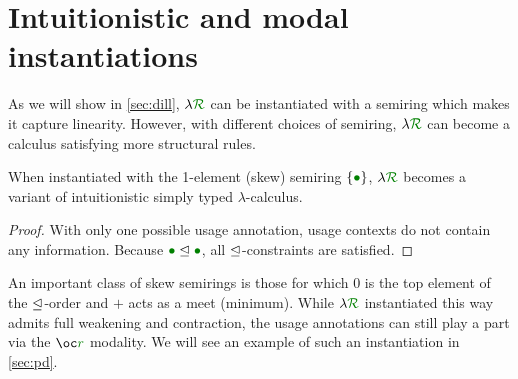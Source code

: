 \documentclass[submission,copyright,creativecommons]{eptcs}
\begin{document}


\section{Intuitionistic and modal instantiations}\label{sec:general}

As we will show in \autoref{sec:dill}, $\name$ can be instantiated with
a semiring which makes it capture linearity.
However, with different choices of semiring, $\name$ can become a calculus
satisfying more structural rules.

\begin{lemma}
  When instantiated with the 1-element (skew) semiring
  $\{\rescomment{\bullet}\}$, $\name$ becomes a variant of intuitionistic
  simply typed $\lambda$-calculus.
\end{lemma}
\begin{proof}
  With only one possible usage annotation, usage contexts do not contain any
  information.
  Because $\rescomment{\bullet} \subres \rescomment{\bullet}$, all
  $\trianglelefteq$-constraints are satisfied.
\end{proof}

An important class of skew semirings is those for which $0$ is the top element
of the $\trianglelefteq$-order and $+$ acts as a meet (minimum).
While $\name$ instantiated this way admits full weakening and contraction, the
usage annotations can still play a part via the $\excl{r}{}$ modality.
We will see an example of such an instantiation in \autoref{sec:pd}.
\end{document}
